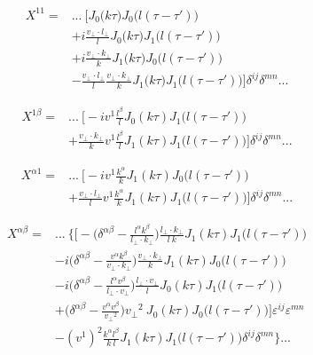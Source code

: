 \documentclass[12pt]{article}
\begin{document}
\begin{equation*}
\begin{split}
 X^{11} = & ... ~ \bigg[ J_0\big(k \tau \big) J_0\big(l(\tau-\tau')\big) \\
& +i \frac{v_\perp \cdot l_\perp}{l} J_0\big(k \tau \big) J_1\big(l(\tau-\tau')\big) \\
& +i \frac{v_\perp \cdot k_\perp}{k} J_1\big(k \tau \big) J_0\big(l(\tau-\tau')\big) \\
& - \frac{v_\perp \cdot l_\perp}{l} \frac{v_\perp \cdot k_\perp}{k} J_1\big(k \tau \big) J_1\big(l(\tau-\tau')\big)
\bigg] \delta^{ij} \delta^{mn}... 
\end{split}
\end{equation*}

\begin{equation*}
\begin{split}
 X^{1 \beta} = & ...~ \bigg[ - i v^1 \frac{l^\beta}{l} J_0(k \tau) J_1\big(l(\tau-\tau') \big)    \\
& + \frac{v_\perp \cdot k_\perp}{k}  v^1 \frac{l^\beta}{l} J_1 (k\tau) J_1\big(l(\tau-\tau') \big)  \bigg] \delta^{ij} \delta^{mn} ...
\end{split}
\end{equation*}

\begin{equation*}
\begin{split}
 X^{\alpha 1} = &...~ \bigg[  - i v^1 \frac{k^\alpha}{k} J_1(k \tau) J_0\big(l(\tau-\tau')\big)   \\
& + \frac{v_\perp \cdot l_\perp}{l}  v^1 \frac{k^\alpha}{k} J_1(k\tau) J_1\big(l(\tau-\tau')\big)  \bigg] \delta^{ij} \delta^{mn}  ...
\end{split}
\end{equation*}


\begin{equation*}
\begin{split}
 X^{\alpha \beta} = & ...~ \bigg\{ \bigg[ -\Big(\delta^{\alpha \beta}  - \frac{l^\alpha k^\beta}{l_\perp \cdot k_\perp}\Big) \frac{l_\perp \cdot k_\perp}{l ~k} J_1 (k \tau) J_1\big(l(\tau-\tau')\big) \\
& -i \Big(\delta^{\alpha \beta}  - \frac{v^\alpha k^\beta}{v_\perp \cdot k_\perp}\Big) \frac{v_\perp \cdot k_\perp}{k} J_1 (k \tau) J_0\big(l(\tau-\tau')\big) \\
& -i \Big(\delta^{\alpha \beta}  - \frac{l^\alpha v^\beta}{l_\perp \cdot v_\perp}\Big) \frac{l_\perp \cdot v_\perp}{l} J_0 (k \tau) J_1\big(l(\tau-\tau')\big) \\
& + \Big(\delta^{\alpha \beta}  - \frac{v^\alpha v^\beta}{{v_\perp}^2}\Big) {v_\perp}^2 ~ J_0 (k \tau) J_0\big(l(\tau-\tau')\big) \bigg] \varepsilon^{ij} \varepsilon^{mn} \\ 
& -(v^1)^2 \frac{k^\alpha l^\beta}{k ~l} J_1 (k \tau) J_1\big(l(\tau-\tau')\big) \delta^{ij} \delta^{mn} \bigg\} ...
\end{split}
\end{equation*}
\end{document}
